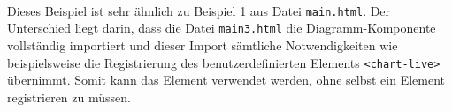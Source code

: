 \begin{enumerate}




 \hfill \\
Dieses Beispiel ist sehr ähnlich zu Beispiel 1 aus Datei \lstinline|main.html|. Der Unterschied liegt darin, dass die Datei \lstinline|main3.html| die Diagramm-Komponente vollständig importiert und dieser Import sämtliche Notwendigkeiten wie beispielsweise die Registrierung des benutzerdefinierten Elements \lstinline|<chart-live>| übernimmt. Somit kann das Element verwendet werden, ohne selbst ein Element registrieren zu müssen.
\end{enumerate}
